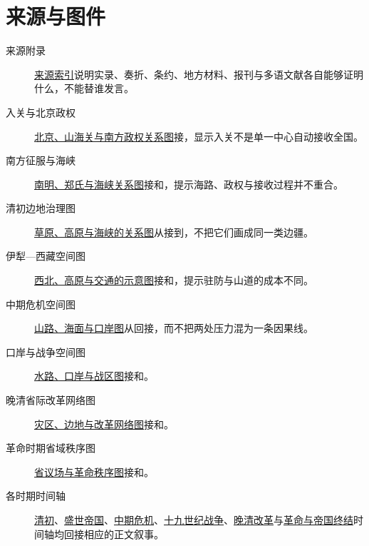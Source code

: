 \section*{来源与图件}
\label{app:index-sources}
\begin{description}
  \item[来源附录] \hyperref[app:sources]{来源索引}说明实录、奏折、条约、地方材料、报刊与多语文献各自能够证明什么，不能替谁发言。
  \item[入关与北京政权] \hyperref[fig:qing-entry-competing-centers]{北京、山海关与南方政权关系图}接，显示入关不是单一中心自动接收全国。
  \item[南方征服与海峡] \hyperref[fig:southern-conquest-southern-ming-sea]{南明、郑氏与海峡关系图}接和，提示海路、政权与接收过程并不重合。
  \item[清初边地治理图] \hyperref[fig:early-qing-frontier-governance]{草原、高原与海峡的关系图}从接到，不把它们画成同一类边疆。
  \item[伊犁—西藏空间图] \hyperref[fig:high-qing-frontier-ili-tibet]{西北、高原与交通的示意图}接和，提示驻防与山道的成本不同。
  \item[中期危机空间图] \hyperref[fig:mid-qing-crisis-overview]{山路、海面与口岸图}从回接，而不把两处压力混为一条因果线。
  \item[口岸与战争空间图] \hyperref[fig:treaty-ports-wars]{水路、口岸与战区图}接和。
  \item[晚清省际改革网络图] \hyperref[fig:provincial-reform-networks]{灾区、边地与改革网络图}接和。
  \item[革命时期省域秩序图] \hyperref[fig:revolution-provincial-order]{省议场与革命秩序图}接和。
  \item[各时期时间轴] \hyperref[fig:early-qing-timeline]{清初}、\hyperref[fig:high-qing-timeline]{盛世帝国}、\hyperref[fig:mid-qing-crisis-timeline]{中期危机}、\hyperref[fig:nineteenth-century-conflicts-timeline]{十九世纪战争}、\hyperref[fig:late-qing-reform-timeline]{晚清改革}与\hyperref[fig:revolution-and-empire-end-timeline]{革命与帝国终结}时间轴均回接相应的正文叙事。
\end{description}